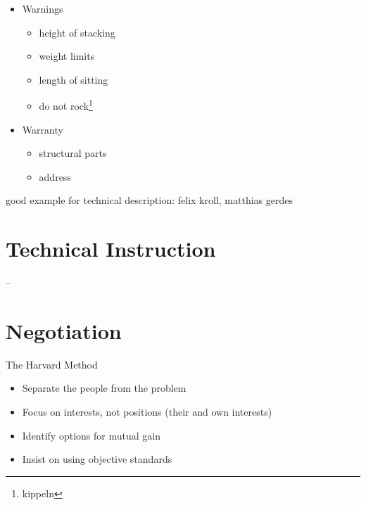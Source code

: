 \begin{itemize}
\begin{itemize}
\begin{itemize}
\end{itemize}
\end{itemize}
\item Warnings
\begin{itemize}
\item height of stacking
\item weight limits
\item length of sitting
\item do not rock\footnote{kippeln}
\end{itemize}
\item Warranty
\begin{itemize}
\item structural parts
\item address
\end{itemize}
\end{itemize}

good example for technical description: felix kroll, matthias gerdes

\section{Technical Instruction}
--

\section{Negotiation}
The Harvard Method
\begin{itemize}
\item Separate the people from the problem
\item Focus on interests, not positions (their and own interests)
\item Identify options for mutual gain
\item Insist on using objective standards
\end{itemize}



